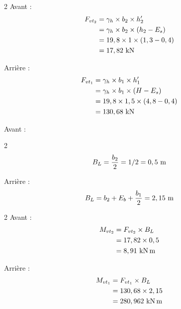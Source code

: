 \documentclass[12pt,a4paper]{report}
\newcommand{\fvt}{F_{vt_{1}}}
\newcommand{\fvtt}{F_{vt_{2}}}
\newcommand{\mvt}{M_{vt_{1}}}
\newcommand{\mvtt}{M_{vt_{2}}}
\newcommand{\gammah}{\gamma_{h}}
\begin{document}
	
	
	\begin{tcolorbox}[colback=white, colframe=gray!50, title=\textcolor{black}{\textbf{La force}}]
		\begin{multicols}{2}
			Avant :
			\[ \begin{aligned}
				\fvtt &= \gammah \times b_{2} \times h_{2}' \\
				&= \gammah \times b_{2} \times (h_{2} - E_{s}) \\
				&= 19,8 \times 1 \times (1,3 - 0,4) \\
				&= 17,82\kn
			\end{aligned} \]
			
			\columnbreak
			
			Arrière : 
			\[ \begin{aligned}
				\fvt &= \gammah \times b_{1} \times h_{1}' \\
				&= \gammah \times b_{1} \times (H - E_{s}) \\
				&= 19,8 \times 1,5 \times (4,8 - 0,4) \\
				&= 130,68\kn
			\end{aligned} \]
			
		\end{multicols}
	\end{tcolorbox}
	
	
	\begin{tcolorbox}[colback=white, colframe=gray!50, title=\textcolor{black}{\textbf{B.L}}]
		Avant :
		\begin{multicols}{2}
			\[ \begin{aligned}
				B_{L} = \dfrac{b_{2}}{2} = 1/2 = 0,5\meterl
			\end{aligned} \]
			
			\columnbreak
			
			Arrière :
			\[ \begin{aligned}
				B_{L} = b_{2}  + E_{b} + \dfrac{b_{1}}{2} = 2,15\meterl
			\end{aligned} \]
		\end{multicols}
	\end{tcolorbox}
	
	\begin{tcolorbox}[colback=white, colframe=gray!50, title=\textcolor{black}{\textbf{Moment/A}}]
		\begin{multicols}{2}
			Avant :
			\[ \begin{aligned}
				\mvtt &= \fvtt \times B_{L} \\
				&= 17,82 \times 0,5 \\
				&= 8,91\knxm
			\end{aligned} \]
			
			\columnbreak
			
			Arrière :
			\[ \begin{aligned}
				\mvt &= \fvt \times B_{L} \\
				&= 130,68 \times 2,15 \\
				&= 280,962\knxm
			\end{aligned} \]
		\end{multicols}
	\end{tcolorbox}
	
\end{document}
